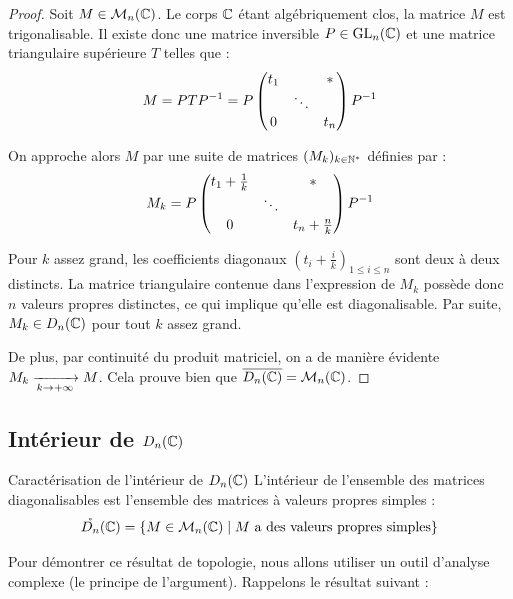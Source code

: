 \begin{proof}
    Soit $M \in \mathcal{M}_n(\mathbb{C})$. Le corps $\mathbb{C}$ étant algébriquement clos, la matrice $M$ est trigonalisable. Il existe donc une matrice inversible $P \in \operatorname{GL}_n(\mathbb{C})$ et une matrice triangulaire supérieure $T$ telles que :
    \[ M = P T P^{-1} = P \begin{pmatrix} 
        t_1 & & * \\ 
        & \ddots & \\ 
        0 & & t_n 
    \end{pmatrix} P^{-1} \]
    
    On approche alors $M$ par une suite de matrices $(M_k)_{k \in \mathbb{N}^*}$ définies par :
    \[ M_k = P \begin{pmatrix} 
        t_1 + \frac{1}{k} & & * \\ 
        & \ddots & \\ 
        0 & & t_n + \frac{n}{k} 
    \end{pmatrix} P^{-1} \]
    
    Pour $k$ assez grand, les coefficients diagonaux $\left(t_i + \frac{i}{k}\right)_{1 \leqslant i \leqslant n}$ sont deux à deux distincts. La matrice triangulaire contenue dans l'expression de $M_k$ possède donc $n$ valeurs propres distinctes, ce qui implique qu'elle est diagonalisable. 
    Par suite, $M_k \in D_n(\mathbb{C})$ pour tout $k$ assez grand.
    
    De plus, par continuité du produit matriciel, on a de manière évidente $M_k \xrightarrow[k \to +\infty]{} M$. Cela prouve bien que $\overline{D_n(\mathbb{C})} = \mathcal{M}_n(\mathbb{C})$.
\end{proof}


\subsection{Intérieur de \texorpdfstring{$D_n(\mathbb{C})$}{Dn(C)}}

\begin{theoreme}{Caractérisation de l'intérieur de $D_n(\mathbb{C})$}{}
    L'intérieur de l'ensemble des matrices diagonalisables est l'ensemble des matrices à valeurs propres simples :
    \[ \mathring{D_n}(\mathbb{C}) = \left\{ M \in \mathcal{M}_n(\mathbb{C}) \mid M \text{ a des valeurs propres simples} \right\} \]
\end{theoreme}

Pour démontrer ce résultat de topologie, nous allons utiliser un outil d'analyse complexe (le principe de l'argument). Rappelons le résultat suivant :

